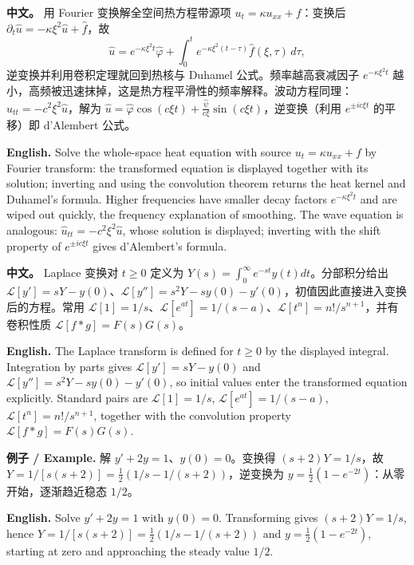 \documentclass[UTF8,11pt,a4paper]{ctexart}
\newcommand{\EN}[1]{\par\noindent \textbf{English.} #1\par}
\newcommand{\EX}[2]{\par\noindent \textbf{例子 / Example.} #1\par\EN{#2}}
\newcommand{\APS}[2]{\par\noindent\textbf{中文。} #1\par\noindent\textbf{English.} #2\par\smallskip}
\begin{document}
\APS{用 Fourier 变换解全空间热方程带源项 $u_t=\kappa u_{xx}+f$：变换后 $\partial_t\widehat u=-\kappa\xi^2\widehat u+\widehat f$，故
\[
\widehat u=e^{-\kappa\xi^2t}\widehat\varphi+\int_0^te^{-\kappa\xi^2(t-\tau)}\widehat f(\xi,\tau)\,d\tau,
\]
逆变换并利用卷积定理就回到热核与 Duhamel 公式。频率越高衰减因子 $e^{-\kappa\xi^2t}$ 越小，高频被迅速抹掉，这是热方程平滑性的频率解释。波动方程同理：$\widehat u_{tt}=-c^2\xi^2\widehat u$，解为 $\widehat u=\widehat\varphi\cos(c\xi t)+\frac{\widehat\psi}{c\xi}\sin(c\xi t)$，逆变换（利用 $e^{\pm ic\xi t}$ 的平移）即 d'Alembert 公式。}{Solve the whole-space heat equation with source $u_t=\kappa u_{xx}+f$ by Fourier transform: the transformed equation is displayed together with its solution; inverting and using the convolution theorem returns the heat kernel and Duhamel's formula. Higher frequencies have smaller decay factors $e^{-\kappa\xi^2t}$ and are wiped out quickly, the frequency explanation of smoothing. The wave equation is analogous: $\widehat u_{tt}=-c^2\xi^2\widehat u$, whose solution is displayed; inverting with the shift property of $e^{\pm ic\xi t}$ gives d'Alembert's formula.}
\APS{Laplace 变换对 $t\ge0$ 定义为 $Y(s)=\int_0^\infty e^{-st}y(t)dt$。分部积分给出 $\mathcal L[y']=sY-y(0)$、$\mathcal L[y'']=s^2Y-sy(0)-y'(0)$，初值因此直接进入变换后的方程。常用 $\mathcal L[1]=1/s$、$\mathcal L[e^{at}]=1/(s-a)$、$\mathcal L[t^n]=n!/s^{n+1}$，并有卷积性质 $\mathcal L[f*g]=F(s)G(s)$。}{The Laplace transform is defined for $t\ge0$ by the displayed integral. Integration by parts gives $\mathcal L[y']=sY-y(0)$ and $\mathcal L[y'']=s^2Y-sy(0)-y'(0)$, so initial values enter the transformed equation explicitly. Standard pairs are $\mathcal L[1]=1/s$, $\mathcal L[e^{at}]=1/(s-a)$, $\mathcal L[t^n]=n!/s^{n+1}$, together with the convolution property $\mathcal L[f*g]=F(s)G(s)$.}
\EX{解 $y'+2y=1$、$y(0)=0$。变换得 $(s+2)Y=1/s$，故 $Y=1/[s(s+2)]=\frac12(1/s-1/(s+2))$，逆变换为 $y=\frac12(1-e^{-2t})$：从零开始，逐渐趋近稳态 $1/2$。}{Solve $y'+2y=1$ with $y(0)=0$. Transforming gives $(s+2)Y=1/s$, hence $Y=1/[s(s+2)]=\frac12(1/s-1/(s+2))$ and $y=\frac12(1-e^{-2t})$, starting at zero and approaching the steady value $1/2$.}
\end{document}

